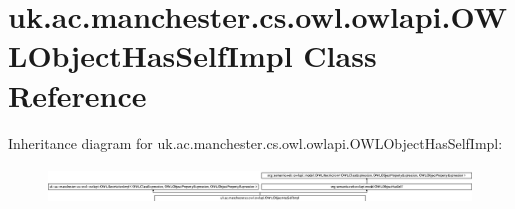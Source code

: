 \hypertarget{classuk_1_1ac_1_1manchester_1_1cs_1_1owl_1_1owlapi_1_1_o_w_l_object_has_self_impl}{\section{uk.\-ac.\-manchester.\-cs.\-owl.\-owlapi.\-O\-W\-L\-Object\-Has\-Self\-Impl Class Reference}
\label{classuk_1_1ac_1_1manchester_1_1cs_1_1owl_1_1owlapi_1_1_o_w_l_object_has_self_impl}
}
Inheritance diagram for uk.\-ac.\-manchester.\-cs.\-owl.\-owlapi.\-O\-W\-L\-Object\-Has\-Self\-Impl\-:\begin{figure}[H]
\begin{center}
\leavevmode
\includegraphics[height=1.000000cm]{classuk_1_1ac_1_1manchester_1_1cs_1_1owl_1_1owlapi_1_1_o_w_l_object_has_self_impl}
\end{center}
\end{figure}
